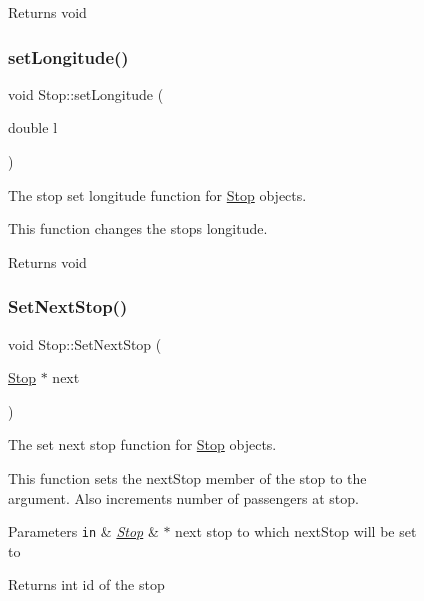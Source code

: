 \begin{figure}[H]
\begin{center}
\begin{DoxyReturn}{Returns}
void 
\end{DoxyReturn}
\mbox{\label{classStop_a26866e7dfd469467c67d4176693b53c7}} 
\subsubsection{\texorpdfstring{set\+Longitude()}{setLongitude()}}
{\footnotesize\ttfamily void Stop\+::set\+Longitude (\begin{DoxyParamCaption}\item[{double}]{l }\end{DoxyParamCaption})}



The stop set longitude function for \hyperlink{classStop}{Stop} objects. 

This function changes the stop\textquotesingle{}s longitude.

\begin{DoxyReturn}{Returns}
void 
\end{DoxyReturn}
\mbox{\label{classStop_a7e39a7138f5bcf8f144155de7b1ae1aa}} 
\subsubsection{\texorpdfstring{Set\+Next\+Stop()}{SetNextStop()}}
{\footnotesize\ttfamily void Stop\+::\+Set\+Next\+Stop (\begin{DoxyParamCaption}\item[{\hyperlink{classStop}{Stop} $\ast$}]{next }\end{DoxyParamCaption})\hspace{0.3cm}{\ttfamily [inline]}}



The set next stop function for \hyperlink{classStop}{Stop} objects. 

This function sets the next\+Stop member of the stop to the argument. Also increments number of passengers at stop.


\begin{DoxyParams}[1]{Parameters}
\mbox{\tt in}  & {\em \hyperlink{classStop}{Stop}} & $\ast$ next stop to which next\+Stop will be set to\\
\hline
\end{DoxyParams}
\begin{DoxyReturn}{Returns}
int id of the stop 
\end{DoxyReturn}
\mbox{\label{classStop_aa373ae256ce6bc01ef13e876dfdec5bd}} 

\end{center}
\end{figure}
